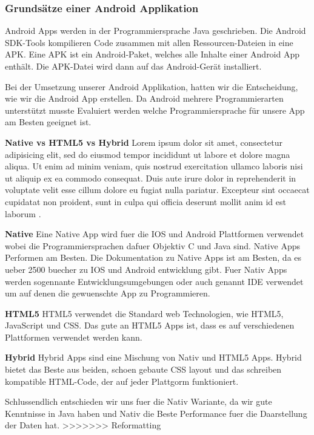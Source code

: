 \subsubsection{Grundsätze einer Android Applikation}
\label{subsec:aapp-fundam}

Android Apps werden in der Programmiersprache Java geschrieben.
Die Android SDK-Tools kompilieren Code zusammen mit allen Ressourcen-Dateien in eine APK.
Eine APK ist ein Android-Paket, welches alle Inhalte einer Android App enthält. 
Die APK-Datei wird dann auf das Android-Gerät installiert. 

Bei der Umsetzung unserer Android Applikation, hatten wir die Entscheidung, wie wir die Android App erstellen. 
Da Android mehrere Programmierarten unterstützt musste Evaluiert werden welche Programmiersprache für unsere App am Besten geeignet ist. \nextline

\textbf{Native vs HTML5 vs Hybrid}
Lorem ipsum dolor sit amet, consectetur adipisicing elit, sed do eiusmod
tempor incididunt ut labore et dolore magna aliqua. Ut enim ad minim veniam,
quis nostrud exercitation ullamco laboris nisi ut aliquip ex ea commodo
consequat. Duis aute irure dolor in reprehenderit in voluptate velit esse
cillum dolore eu fugiat nulla pariatur. Excepteur sint occaecat cupidatat non
proident, sunt in culpa qui officia deserunt mollit anim id est laborum \cite{FAIF.CH2-android-dev.NativeWeborHybrid}. 

\textbf{Native\newline} 
Eine Native App wird fuer die IOS und Android Plattformen verwendet wobei die Programmiersprachen dafuer Objektiv C und Java sind.
Native Apps Performen am Besten.
Die Dokumentation zu Native Apps ist am Besten, da es ueber 2500 buecher zu IOS und Android entwicklung gibt.
Fuer Nativ Apps werden sogennante Entwicklungsumgebungen oder auch genannt IDE verwendet um auf denen die gewuenschte App zu Programmieren.\nextline

\textbf{HTML5\newline} 
HTML5 verwendet die Standard web Technologien, wie HTML5, JavaScript und CSS. Das gute an HTML5 Apps ist, dass es auf verschiedenen Plattformen verwendet werden kann.\nextline

\textbf{Hybrid\newline} 
Hybrid Apps sind eine Mischung von Nativ und HTML5 Apps. Hybrid bietet das Beste aus beiden, schoen gebaute CSS layout und das schreiben kompatible HTML-Code, der auf jeder Plattgorm funktioniert.\nextline

Schlussendlich entschieden wir uns fuer die Nativ Wariante, da wir gute Kenntnisse in Java haben und Nativ die Beste Performance fuer die Daarstellung der Daten hat.
>>>>>>> Reformatting
\clearpage %